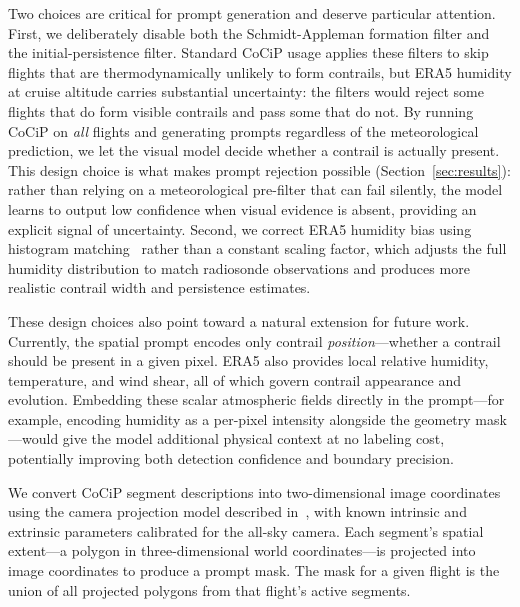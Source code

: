 \documentclass[review]{elsarticle}
\begin{document}
Two choices are critical for prompt generation and deserve particular attention. First, we deliberately disable both the Schmidt-Appleman formation filter and the initial-persistence filter. Standard CoCiP usage applies these filters to skip flights that are thermodynamically unlikely to form contrails, but ERA5 humidity at cruise altitude carries substantial uncertainty: the filters would reject some flights that do form visible contrails and pass some that do not. By running CoCiP on \emph{all} flights and generating prompts regardless of the meteorological prediction, we let the visual model decide whether a contrail is actually present. This design choice is what makes prompt rejection possible (Section~\ref{sec:results}): rather than relying on a meteorological pre-filter that can fail silently, the model learns to output low confidence when visual evidence is absent, providing an explicit signal of uncertainty. Second, we correct ERA5 humidity bias using histogram matching~\cite{pycontrails} rather than a constant scaling factor, which adjusts the full humidity distribution to match radiosonde observations and produces more realistic contrail width and persistence estimates.

These design choices also point toward a natural extension for future work. Currently, the spatial prompt encodes only contrail \emph{position}---whether a contrail should be present in a given pixel. ERA5 also provides local relative humidity, temperature, and wind shear, all of which govern contrail appearance and evolution. Embedding these scalar atmospheric fields directly in the prompt---for example, encoding humidity as a per-pixel intensity alongside the geometry mask---would give the model additional physical context at no labeling cost, potentially improving both detection confidence and boundary precision.



We convert CoCiP segment descriptions into two-dimensional image coordinates using the camera projection model described in~\cite{jarry2025gvccs}, with known intrinsic and extrinsic parameters calibrated for the all-sky camera. Each segment's spatial extent---a polygon in three-dimensional world coordinates---is projected into image coordinates to produce a prompt mask. The mask for a given flight is the union of all projected polygons from that flight's active segments.
\end{document}
